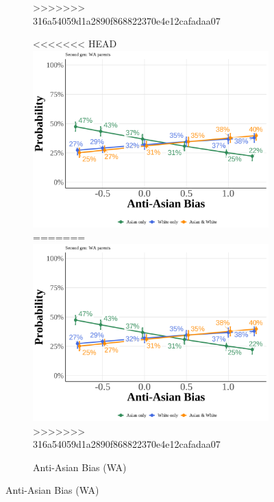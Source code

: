 \begin{center}
\begin{figure}[!htb]
\begin{subfigure}{.48\textwidth}
>>>>>>> 316a54059d1a2890f868822370e4e12cafadaa07
\end{subfigure}
\hfill
\begin{subfigure}{.48\textwidth}
\caption{Anti-Asian Bias (WA)}
\centering
<<<<<<< HEAD
\includegraphics[width=1\linewidth]{pp_second_wa_value_simple.png}\label{subfig:pp-secgen-wa-bias}
=======
\includegraphics[width=1\linewidth]{pp_second_wa_value_simple.png}
>>>>>>> 316a54059d1a2890f868822370e4e12cafadaa07
\end{subfigure}

\vspace{0.5cm}


\end{figure}
\end{center}
